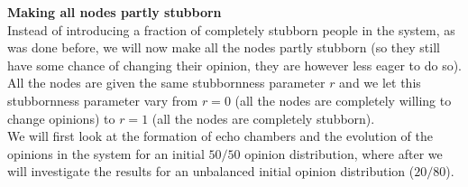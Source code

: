\documentclass[11 pt , letterpaper , twoside , openright]{book}
\begin{document}
\newpage
\noindent
\textbf{Making all nodes partly stubborn}\\
\newline
Instead of introducing a fraction of completely stubborn people in the system, as was done before, we will now make all the nodes partly stubborn (so they still have some chance of changing their opinion, they are however less eager to do so). All the nodes are given the same stubbornness parameter $r$ and we let this stubbornness parameter vary from $r = 0$ (all the nodes are completely willing to change opinions) to $r=1$ (all the nodes are completely stubborn).\\
We will first look at the formation of echo chambers and the evolution of the opinions in the system for an initial $50/50$ opinion distribution, where after we will investigate the results for an unbalanced initial opinion distribution ($20/80$).
\end{document}
